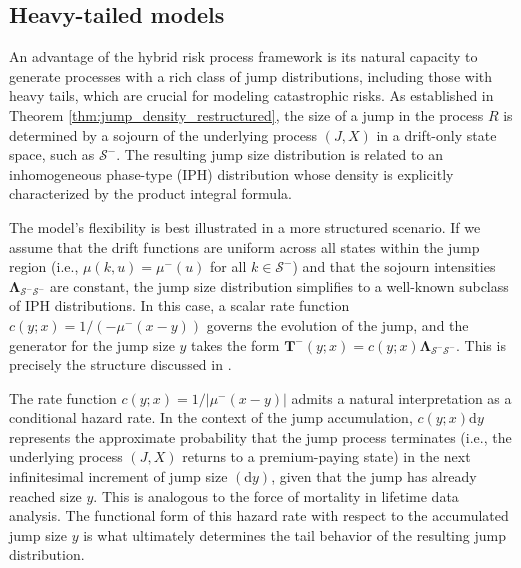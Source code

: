 \documentclass[11pt]{article}
\numberwithin{table}{section}
\numberwithin{figure}{section}
\numberwithin{equation}{section}
\newcommand{\dd}{\mathrm{d}}
\newcommand{\1}{{\mathbf 1}}
\newcommand{\0}{\mat{0}}
\begin{document}
\subsection{Heavy-tailed models}

An advantage of the hybrid risk process framework is its natural capacity to generate processes with a rich class of jump distributions, including those with heavy tails, which are crucial for modeling catastrophic risks. As established in Theorem \ref{thm:jump_density_restructured}, the size of a jump in the process $R$ is determined by a sojourn of the underlying process $(J,X)$ in a drift-only state space, such as $\mathcal{S}^-$. The resulting jump size distribution is related to an inhomogeneous phase-type (IPH) distribution whose density is explicitly characterized by the product integral formula.

The model's flexibility is best illustrated in a more structured scenario. If we assume that the drift functions are uniform across all states within the jump region (i.e., $\mu(k,u) = \mu^-(u)$ for all $k \in \mathcal{S}^-$) and that the sojourn intensities $\bm{\Lambda}_{\mathcal{S}^-\mathcal{S}^-}$ are constant, the jump size distribution simplifies to a well-known subclass of IPH distributions. In this case, a scalar rate function $c(y;x)=1/(-\mu^-(x-y))$ governs the evolution of the jump, and the generator for the jump size $y$ takes the form $\bm{T}^-(y;x) = c(y;x)\bm{\Lambda}_{\mathcal{S}^-\mathcal{S}^-}$. This is precisely the structure discussed in \cite[Definition 2.5]{albrecher2018ph}.

The rate function $c(y;x) = 1/|\mu^-(x-y)|$ admits a natural interpretation as a conditional hazard rate. In the context of the jump accumulation, $c(y;x)\dd y$ represents the approximate probability that the jump process terminates (i.e., the underlying process $(J,X)$ returns to a premium-paying state) in the next infinitesimal increment of jump size $(\dd y)$, given that the jump has already reached size $y$. This is analogous to the force of mortality in lifetime data analysis. The functional form of this hazard rate with respect to the accumulated jump size $y$ is what ultimately determines the tail behavior of the resulting jump distribution.
\end{document}
